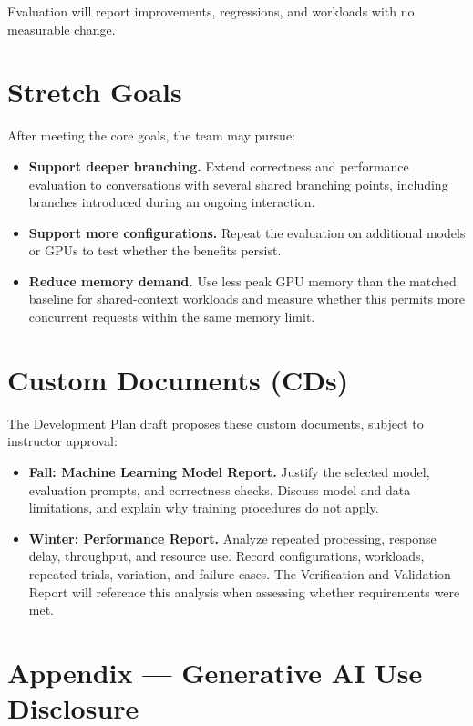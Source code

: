 \documentclass[11pt]{article}
\begin{document}
Evaluation will report improvements, regressions, and workloads with no
measurable change.

\section{Stretch Goals}

After meeting the core goals, the team may pursue:
\begin{itemize}
  \item \textbf{Support deeper branching.} Extend correctness and
  performance evaluation to conversations with several shared branching
  points, including branches introduced during an ongoing interaction.
  \item \textbf{Support more configurations.} Repeat the evaluation on
  additional models or GPUs to test whether the benefits persist.
  \item \textbf{Reduce memory demand.} Use less peak GPU memory than the
  matched baseline for shared-context workloads and measure whether this
  permits more concurrent requests within the same memory limit.
\end{itemize}

\section{Custom Documents (CDs)}

The Development Plan draft proposes these custom documents, subject to
instructor approval:

\begin{itemize}
  \item \textbf{Fall: Machine Learning Model Report.} Justify the selected
  model, evaluation prompts, and correctness checks. Discuss model and data
  limitations, and explain why training procedures do not apply.
  \item \textbf{Winter: Performance Report.} Analyze repeated processing,
  response delay, throughput, and resource use. Record configurations,
  workloads, repeated trials, variation, and failure cases. The Verification
  and Validation Report will reference this analysis when assessing
  whether requirements were met.
\end{itemize}




\section*{Appendix --- Generative AI Use Disclosure}
\end{document}
